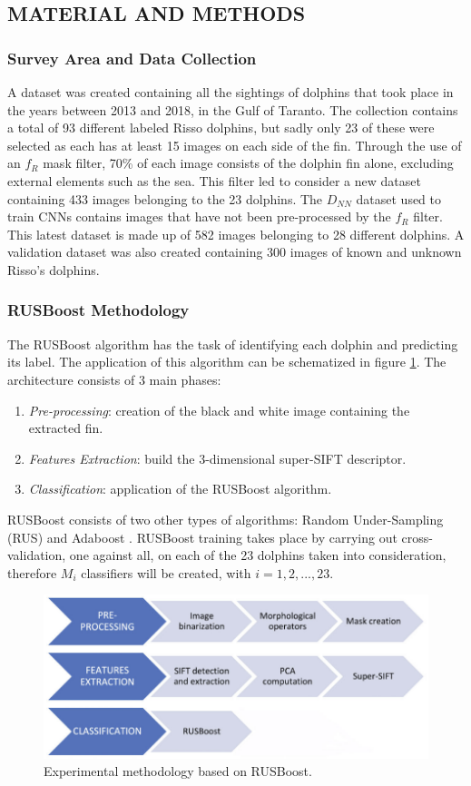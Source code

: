 \subsection{MATERIAL AND METHODS}
\subsubsection{Survey Area and Data Collection}
A dataset was created containing all the sightings of dolphins that took place 
in the years between 2013 and 2018, in the Gulf of Taranto. The collection 
contains a total of 93 different labeled Risso dolphins, but sadly only 23 of 
these were selected as each has at least 15 images on each side of the fin. 
Through the use of an $f_R$ mask filter, 70\% of each image consists of the 
dolphin fin alone, excluding external elements such as the sea. This filter 
led to consider a new dataset containing 433 images belonging to the 23 
dolphins. The $D_{NN}$ dataset used to train CNNs contains images that have 
not been pre-processed by the $f_R$ filter. This latest dataset is made up of 
582 images belonging to 28 different dolphins. A validation dataset was also 
created containing 300 images of known and unknown Risso's dolphins.

\subsubsection{RUSBoost Methodology}
The RUSBoost algorithm has the task of identifying each dolphin and predicting 
its label. The application of this algorithm can be schematized in 
figure \ref{fig:RUSBoost}. The architecture consists of 3 main phases:
\begin{enumerate}
    \item \emph{Pre-processing}: creation of the black and white image containing the 
    extracted fin.
    \item \emph{Features Extraction}: build the 3-dimensional super-SIFT descriptor. 
    \item \emph{Classification}: application of the RUSBoost algorithm.
\end{enumerate}
RUSBoost consists of two other types of algorithms: Random Under-Sampling 
(RUS) and Adaboost \cite{0907875811}. RUSBoost training takes place by carrying out 
cross-validation, one against all, on each of the 23 dolphins taken into consideration, 
therefore $M_i$ classifiers will be created, with $i = 1,2,...,23$.
\begin{figure}[h!]
    \centering
    \includegraphics[width = 0.8\linewidth]{images/paper10/RUSBoost.png}
    \centering
    \caption{Experimental methodology based on RUSBoost.}
    \label{fig:RUSBoost}
\end{figure}

